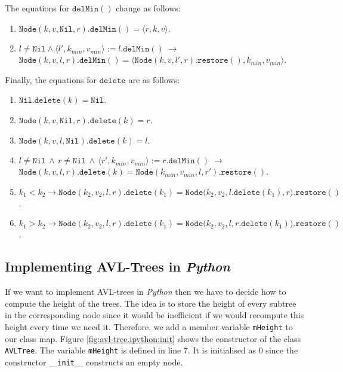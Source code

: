 The equations for  $\texttt{delMin}()$ change as follows:
\begin{enumerate}
\item $\texttt{Node}(k, v, \texttt{Nil}, r).\texttt{delMin}() = \langle r, k, v \rangle$.
\item $l\not= \texttt{Nil} \wedge \langle l',k_{min}, v_{min}\rangle := l.\texttt{delMin}() 
       \;\rightarrow$ \\[0.2cm]
       \hspace*{1.3cm} 
       $\texttt{Node}(k, v, l, r).\texttt{delMin}() = 
        \langle \texttt{Node}(k, v, l', r).\texttt{restore}(), k_{min}, v_{min} \rangle$.
\end{enumerate}
Finally, the equations for $\texttt{delete}$ are as follows:
\begin{enumerate}
\item $\texttt{Nil}.\texttt{delete}(k) = \texttt{Nil}$.
\item $\texttt{Node}(k,v,\texttt{Nil},r).\texttt{delete}(k) = r$.
\item $\texttt{Node}(k,v,l,\texttt{Nil}).\texttt{delete}(k) = l$.
\item $l \not= \texttt{Nil} \,\wedge\, r \not= \texttt{Nil} \,\wedge\, 
       \langle r',k_{min}, v_{min} \rangle := r.\texttt{delMin}()  \;\rightarrow$ \\[0.2cm]
      \hspace*{1.3cm}
      $\texttt{Node}(k,v,l,r).\texttt{delete}(k) = \texttt{Node}(k_{min},v_{min},l,r').\texttt{restore}()$.
\item $k_1 < k_2 \rightarrow \texttt{Node}(k_2,v_2,l,r).\texttt{delete}(k_1) = 
       \texttt{Node}\bigl(k_2,v_2,l.\texttt{delete}(k_1),r\bigr).\texttt{restore}()$.
\item $k_1 > k_2 \rightarrow \texttt{Node}(k_2,v_2,l,r).\texttt{delete}(k_1) = 
         \texttt{Node}\bigl(k_2,v_2,l,r.\texttt{delete}(k_1)\bigr).\texttt{restore}()$.
\end{enumerate}


\subsection{Implementing AVL-Trees in \textsl{Python}}
If we want to implement AVL-trees in \textsl{Python} then we have to decide how to compute the height
of the trees.  The idea is to store the height of every subtree in the corresponding node since it
would be inefficient if we would recompute this height every time we need it.  Therefore, we add a
member variable \texttt{mHeight} to our class map.
Figure \ref{fig:avl-tree.ipython:init} shows the constructor of the class \texttt{AVLTree}.  The variable
\texttt{mHeight} is defined in line 7.  It is initialised as $0$ since the constructor \texttt{\_\_init\_\_}
constructs an empty node.  

